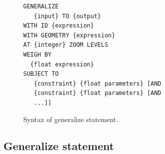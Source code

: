 \begin{figure}[!t]
\begin{center}
\begin{lstlisting}
GENERALIZE 
   {input} TO {output}
WITH ID {expression}
WITH GEOMETRY {expression}
AT {integer} ZOOM LEVELS
WEIGH BY
  {float expression}
SUBJECT TO 
   {constraint} {float parameters} [AND
   {constraint} {float parameters} [AND
   ...]]
\end{lstlisting}
\vspace*{-1ex}
\caption{Syntax of generalize statement.}
\label{fig:generalize:syntax}
\end{center}
\vspace*{-4ex}
\end{figure}

\subsection{Generalize statement}
\label{sec:generalize:statement}


